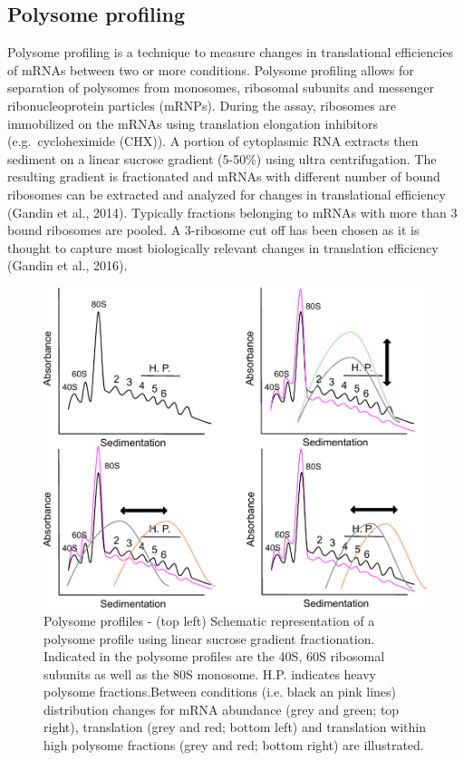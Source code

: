 \documentclass[12pt,openany]{book}
\begin{document}
\subsection{Polysome profiling}

Polysome profiling is a technique to measure changes in translational
efficiencies of mRNAs between two or more conditions. Polysome profiling
allows for separation of polysomes from monosomes, ribosomal subunits
and messenger ribonucleoprotein particles (mRNPs). During the assay,
ribosomes are immobilized on the mRNAs using translation elongation
inhibitors (e.g.~cycloheximide (CHX)). A portion of cytoplasmic RNA
extracts then sediment on a linear sucrose gradient (5-50\%) using ultra
centrifugation. The resulting gradient is fractionated and mRNAs with
different number of bound ribosomes can be extracted and analyzed for
changes in translational efficiency (Gandin et al., 2014). Typically
fractions belonging to mRNAs with more than 3 bound ribosomes are
pooled. A 3-ribosome cut off has been chosen as it is thought to capture
most biologically relevant changes in translation efficiency (Gandin et
al., 2016).

\begin{figure}
    \includegraphics[width=0.9\linewidth]{./figures/polysome_shifts.pdf}
  \caption{Polysome profliles -  (top left) Schematic representation of a polysome profile using linear sucrose gradient fractionation. Indicated in the polysome profiles are the 40S, 60S ribosomal subunits as well as the 80S monosome. H.P. indicates heavy polysome fractions.Between conditions (i.e. black an pink lines) distribution changes for mRNA abundance (grey and green; top right), translation (grey and red; bottom left) and translation within high polysome fractions (grey and red; bottom right) are illustrated. \label{fig:polysome}}
\end{figure}
\end{document}
